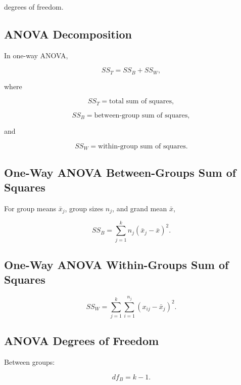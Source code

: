 degrees of freedom.

\subsection{ANOVA Decomposition}
\label{subsec:anova-decomposition-reference}

In one-way ANOVA,

\[
\boxed{
SS_T
=
SS_B
+
SS_W,
}
\]

where

\[
SS_T
=
\text{total sum of squares},
\]

\[
SS_B
=
\text{between-group sum of squares},
\]

and

\[
SS_W
=
\text{within-group sum of squares}.
\]

\subsection{One-Way ANOVA Between-Groups Sum of Squares}
\label{subsec:anova-between-groups}

For group means \(\bar{x}_j\), group sizes \(n_j\), and grand mean
\(\bar{x}\),

\[
\boxed{
SS_B
=
\sum_{j=1}^{k}
n_j
(\bar{x}_j-\bar{x})^2.
}
\]

\subsection{One-Way ANOVA Within-Groups Sum of Squares}
\label{subsec:anova-within-groups}

\[
\boxed{
SS_W
=
\sum_{j=1}^{k}
\sum_{i=1}^{n_j}
(x_{ij}-\bar{x}_j)^2.
}
\]

\subsection{ANOVA Degrees of Freedom}
\label{subsec:anova-degrees-freedom}

Between groups:

\[
\boxed{
df_B
=
k-1.
}
\]

